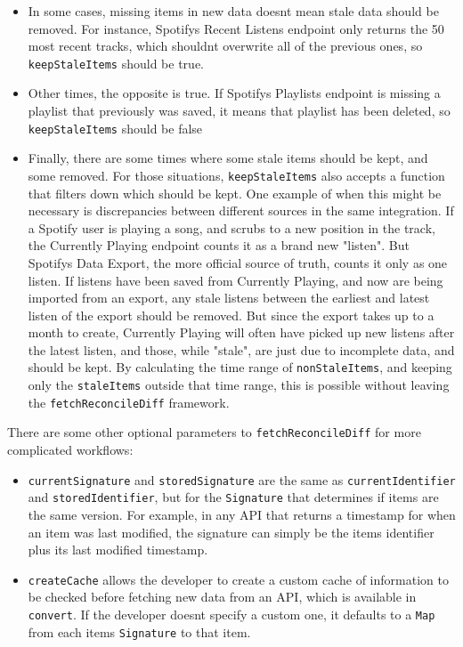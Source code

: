 \documentclass[manuscript,review,anonymous]{acmart}
\begin{document}
\begin{enumerate}
  \begin{itemize}
  \tightlist
  \item
    In some cases, missing items in new data doesn\textquotesingle t
    mean stale data should be removed. For instance,
    Spotify\textquotesingle s Recent Listens endpoint only returns the
    50 most recent tracks, which shouldn\textquotesingle t overwrite all
    of the previous ones, so \texttt{keepStaleItems} should be true.
  \item
    Other times, the opposite is true. If Spotify\textquotesingle s
    Playlists endpoint is missing a playlist that previously was saved,
    it means that playlist has been deleted, so \texttt{keepStaleItems}
    should be false
  \item
    Finally, there are some times where some stale items should be kept,
    and some removed. For those situations, \texttt{keepStaleItems} also
    accepts a function that filters down which should be kept. One
    example of when this might be necessary is discrepancies between
    different sources in the same integration. If a Spotify user is
    playing a song, and scrubs to a new position in the track, the
    Currently Playing endpoint counts it as a brand new "listen". But
    Spotify\textquotesingle s Data Export, the more official source of
    truth, counts it only as one listen. If listens have been saved from
    Currently Playing, and now are being imported from an export, any
    stale listens between the earliest and latest listen of the export
    should be removed. But since the export takes up to a month to
    create, Currently Playing will often have picked up new listens
    after the latest listen, and those, while "stale", are just due to
    incomplete data, and should be kept. By calculating the time range
    of \texttt{nonStaleItems}, and keeping only the \texttt{staleItems}
    outside that time range, this is possible without leaving the
    \texttt{fetchReconcileDiff} framework.
  \end{itemize}
\end{enumerate}

There are some other optional parameters to \texttt{fetchReconcileDiff}
for more complicated workflows:

\begin{itemize}
\tightlist
\item
  \texttt{currentSignature} and \texttt{storedSignature} are the same as
  \texttt{currentIdentifier} and \texttt{storedIdentifier}, but for the
  \texttt{Signature} that determines if items are the same version. For
  example, in any API that returns a timestamp for when an item was last
  modified, the signature can simply be the item\textquotesingle s
  identifier plus its last modified timestamp.
\item
  \texttt{createCache} allows the developer to create a custom cache of
  information to be checked before fetching new data from an API, which
  is available in \texttt{convert}. If the developer
  doesn\textquotesingle t specify a custom one, it defaults to a
  \texttt{Map} from each item\textquotesingle s \texttt{Signature} to
  that item.
\end{itemize}
\end{document}
